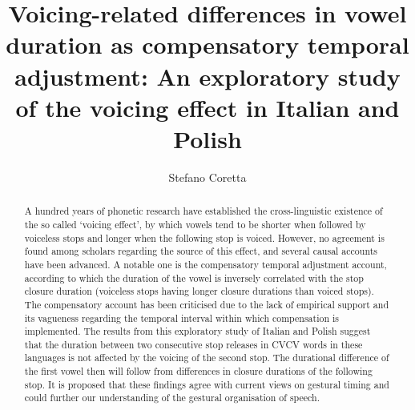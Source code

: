 \documentclass[preprint]{JASAnew}
\begin{document}

\title[Voicing-related differences in vowel duration as compensatory temporal
adjustment]{Voicing-related differences in vowel duration as compensatory temporal
adjustment: An exploratory study of the voicing effect in Italian and
Polish}



\author{Stefano Coretta}






\begin{abstract}
A hundred years of phonetic research have established the
cross-linguistic existence of the so called `voicing effect', by which
vowels tend to be shorter when followed by voiceless stops and longer
when the following stop is voiced. However, no agreement is found among
scholars regarding the source of this effect, and several causal
accounts have been advanced. A notable one is the compensatory temporal
adjustment account, according to which the duration of the vowel is
inversely correlated with the stop closure duration (voiceless stops
having longer closure durations than voiced stops). The compensatory
account has been criticised due to the lack of empirical support and its
vagueness regarding the temporal interval within which compensation is
implemented. The results from this exploratory study of Italian and
Polish suggest that the duration between two consecutive stop releases
in CVCV words in these languages is not affected by the voicing of the
second stop. The durational difference of the first vowel then will
follow from differences in closure durations of the following stop. It
is proposed that these findings agree with current views on gestural
timing and could further our understanding of the gestural organisation
of speech.
\end{abstract}
\end{document}
